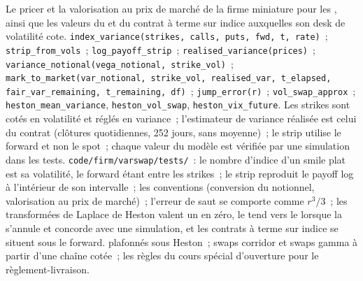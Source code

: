 \begin{build}
 Le pricer et la valorisation au prix de marché de la firme miniature pour les , ainsi que les valeurs
du  et du contrat à terme sur indice auxquelles son desk de volatilité cote.
 \texttt{index\_variance(strikes, calls, puts, fwd, t, rate)}~; \texttt{strip\_from\_vols}~;
\texttt{log\_payoff\_strip}~; \texttt{realised\_variance(prices)}~; \texttt{variance\_notional(vega\_notional,
strike\_vol)}~; \texttt{mark\_to\_market(var\_notional, strike\_vol, realised\_var, t\_elapsed,
fair\_var\_remaining, t\_remaining, df)}~; \texttt{jump\_error(r)}~; \texttt{vol\_swap\_approx}~;
\texttt{heston\_mean\_variance}, \texttt{heston\_vol\_swap}, \texttt{heston\_vix\_future}.
 Les strikes sont cotés en volatilité et réglés en variance~; l'estimateur de variance réalisée est celui du
contrat (clôtures quotidiennes, 252 jours, sans moyenne)~; le strip utilise le forward et non le spot~; chaque valeur du modèle est
vérifiée par une simulation dans les tests.
 \texttt{code/firm/varswap/tests/}~: le nombre d'indice d'un smile plat est sa volatilité,
le forward étant entre les strikes~; le strip reproduit le payoff log à l'intérieur de son intervalle~; les conventions
(conversion du notionnel, valorisation au prix de marché)~; l'erreur de saut se comporte comme $r^3/3$~; les transformées de Laplace de Heston
valent un en zéro, le  tend vers le  lorsque la  s'annule et concorde avec une
simulation, et les contrats à terme sur indice se situent sous le forward.
  plafonnés sous Heston~; swaps corridor et swaps gamma à partir d'une chaîne cotée~; les règles
du cours spécial d'ouverture pour le règlement-livraison.
\end{build}

